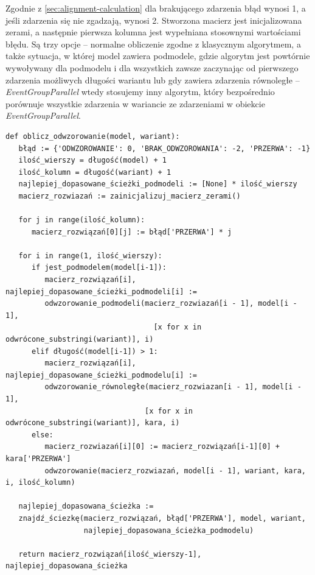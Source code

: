 Zgodnie z \ref{sec:alignment-calculation} dla brakującego zdarzenia błąd wynosi 1, a jeśli zdarzenia się nie zgadzają, wynosi 2. Stworzona macierz jest inicjalizowana zerami, a następnie pierwsza kolumna jest wypełniana stosownymi wartościami błędu. Są trzy opcje -- normalne obliczenie zgodne z klasycznym algorytmem, a także sytuacja, w której model zawiera podmodele, gdzie algorytm jest powtórnie wywoływany dla podmodelu i dla wszystkich zawsze zaczynając od pierwszego zdarzenia możliwych długości wariantu lub gdy zawiera zdarzenia równoległe -- \textit{EventGroupParallel} wtedy stosujemy inny algorytm, który bezpośrednio porównuje wszystkie zdarzenia w wariancie ze zdarzeniami w obiekcie \textit{EventGroupParallel}. 
     
\lstset{caption=Pseudokod obliczania odwzorowania, captionpos=b}
\lstset{label=src:alignment_calculation, frame=single}
\begin{lstlisting}[escapeinside=``]
def oblicz_odwzorowanie(model, wariant):
   błąd := {'ODWZOROWANIE': 0, 'BRAK_ODWZOROWANIA': -2, 'PRZERWA': -1}
   ilość_wierszy = długość(model) + 1
   ilość_kolumn = długość(wariant) + 1
   najlepiej_dopasowane_ścieżki_podmodeli := [None] * ilość_wierszy
   macierz_rozwiazań := zainicjalizuj_macierz_zerami()

   for j in range(ilość_kolumn):
      macierz_rozwiązań[0][j] := błąd['PRZERWA'] * j

   for i in range(1, ilość_wierszy):
      if jest_podmodelem(model[i-1]):
         macierz_rozwiązań[i], najlepiej_dopasowane_ścieżki_podmodeli[i] := 
         odwzorowanie_podmodeli(macierz_rozwiazań[i - 1], model[i - 1],
                                  [x for x in odwrócone_substringi(wariant)], i)
      elif długość(model[i-1]) > 1:
         macierz_rozwiązań[i], najlepiej_dopasowane_ścieżki_podmodelu[i] := 
         odwzorowanie_równoległe(macierz_rozwiazan[i - 1], model[i - 1],
                                [x for x in odwrócone_substringi(wariant)], kara, i)
      else:
         macierz_rozwiazań[i][0] := macierz_rozwiązań[i-1][0] + kara['PRZERWA']
         odwzorowanie(macierz_rozwiazań, model[i - 1], wariant, kara, i, ilość_kolumn)

   najlepiej_dopasowana_ścieżka := 
   znajdź_ściezkę(macierz_rozwiązań, błąd['PRZERWA'], model, wariant, 
                  najlepiej_dopasowana_ścieżka_podmodelu)

   return macierz_rozwiązań[ilość_wierszy-1], najlepiej_dopasowana_ścieżka
\end{lstlisting}

